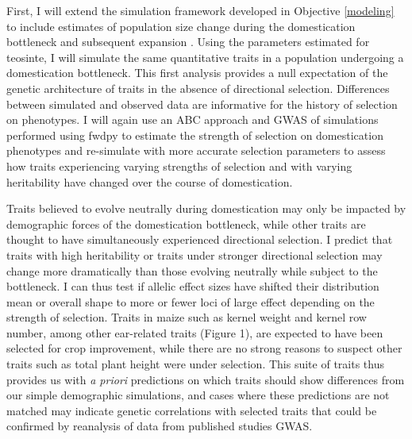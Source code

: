 First, I will extend the simulation framework developed in Objective \ref{modeling} to include estimates of population size change during the domestication bottleneck and subsequent expansion \citep{Wright:2005}. Using the parameters estimated for teosinte, I will simulate the same quantitative traits in a population undergoing a domestication bottleneck. This first analysis provides a null expectation of the genetic architecture of traits in the absence of directional selection. Differences between simulated and observed \citep[][and our own on-going analyses---see Data Management Plan]{Wallace:2014} data are informative for the history of selection on phenotypes. I will again use an ABC approach and GWAS of simulations performed using fwdpy to estimate the strength of selection on domestication phenotypes and re-simulate with more accurate selection parameters to assess how traits experiencing varying strengths of selection and with varying heritability have changed over the course of domestication.


Traits believed to evolve neutrally during domestication may only be impacted by demographic forces of the domestication bottleneck, while other traits are thought to have simultaneously experienced directional selection. I predict that traits with high heritability or traits under stronger directional selection may change more dramatically than those evolving neutrally while subject to the bottleneck. I can thus test if allelic effect sizes have shifted  their distribution mean or overall shape to more or fewer loci of large effect \citep{Chevin:2008} depending on the strength of selection. Traits in maize such as kernel weight and kernel row number, among other ear-related traits (Figure 1), are expected to have been selected for crop improvement, while there are no strong reasons to suspect other traits such as total plant height were under selection. This suite of traits thus provides us with \emph{a priori} predictions on which traits should show differences from our simple demographic simulations, and cases where these predictions are not matched may indicate genetic correlations with selected traits that could be confirmed by reanalysis of data from published studies GWAS. 

